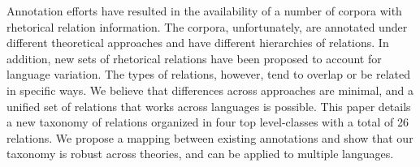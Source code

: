 Annotation efforts have resulted in the availability of a number of corpora with rhetorical relation information. The corpora, unfortunately, are annotated under different theoretical approaches and have different hierarchies of relations. In addition, new sets of rhetorical relations have been proposed to account for language variation. The types of relations, however, tend to overlap or be related in specific ways. We believe that differences across approaches are minimal, and a unified set of relations that works across languages is possible. This paper details a new taxonomy of relations organized in four top level-classes  with a total of 26 relations. We propose a mapping between existing annotations and show that our taxonomy is robust across theories, and can be applied to multiple languages.
